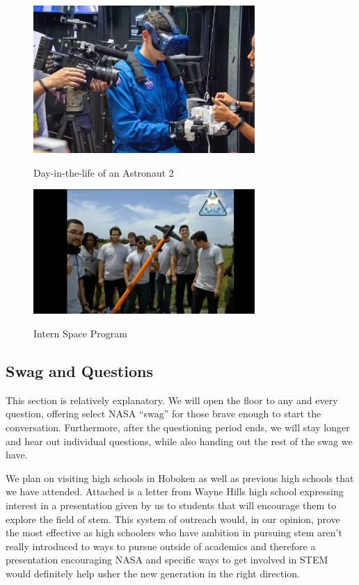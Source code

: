 \documentclass{article}
\let\Oldsubsection\subsection
\renewcommand{\subsection}{\FloatBarrier\Oldsubsection}
\begin{document}
\begin{figure}[!htb]
  \centering
  \caption{Day-in-the-life of an Astronaut 2}
  \includegraphics[width=0.75\textwidth]{assets/vrtest.png}
  \label{fig:vrtest}
\end{figure}

\begin{figure}[!htb]
  \centering
  \caption{Intern Space Program}
  \includegraphics[width=0.75\textwidth]{assets/ronnieandplane.png}
  \label{fig:ronnieandplane}
\end{figure}

\subsection{Swag and Questions}

This section is relatively explanatory. We will open the floor to any and every question, offering select NASA “swag” for those brave enough to start the conversation. Furthermore, after the questioning period ends, we will stay longer and hear out individual questions, while also handing out the rest of the swag we have. 

We plan on visiting high schools in Hoboken as well as previous high schools that we have attended. Attached is a letter from Wayne Hills high school expressing interest in a presentation given by us to students that will encourage them to explore the field of stem. This system of outreach would, in our opinion, prove the most effective as high schoolers who have ambition in pursuing stem aren’t really introduced to ways to pursue outside of academics and therefore a presentation encouraging NASA and specific ways to get involved in STEM would definitely help usher the new generation in the right direction.
\end{document}

